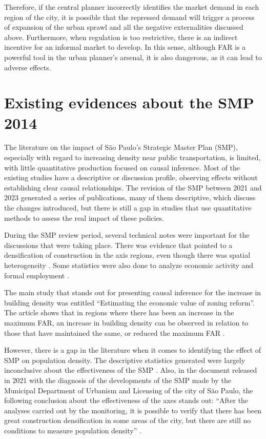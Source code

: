 Therefore, if the central planner incorrectly identifies the market demand in each region of the city, it is possible that the repressed demand will trigger a process of expansion of the urban sprawl and all the negative externalities discussed above. Furthermore, when regulation is too restrictive, there is an indirect incentive for an informal market to develop. In this sense, although FAR is a powerful tool in the urban planner's arsenal, it is also dangerous, as it can lead to adverse effects.

\section{Existing evidences about the SMP 2014}

The literature on the impact of São Paulo's Strategic Master Plan (SMP), especially with regard to increasing density near public transportation, is limited, with little quantitative production focused on causal inference. Most of the existing studies have a descriptive or discussion profile, observing effects without establishing clear causal relationships. The revision of the SMP between 2021 and 2023 generated a series of publications, many of them descriptive, which discuss the changes introduced, but there is still a gap in studies that use quantitative methods to assess the real impact of these policies.

During the SMP review period, several technical notes were important for the discussions that were taking place. There was evidence that pointed to a densification of construction in the axis regions, even though there was spatial heterogeneity \cite{IU50, nt1, nt2, Marques2023}. Some statistics were also done to analyze economic activity and formal employment \cite{IU52, IU54}.

The main study that stands out for presenting causal inference for the increase in building density was entitled ``Estimating the economic value of zoning reform''. The article shows that in regions where there has been an increase in the maximum FAR, an increase in building density can be observed in relation to those that have maintained the same, or reduced the maximum FAR \cite{Anagol2021}.

However, there is a gap in the literature when it comes to identifying the effect of SMP on population density. The descriptive statistics generated were largely inconclusive about the effectiveness of the SMP \cite{IU51, IU66}. Also, in the document released in 2021 with the diagnosis of the developments of the SMP made by the Municipal Department of Urbanism and Licensing of the city of São Paulo, the following conclusion about the effectiveness of the axes stands out: ``After the analyses carried out by the monitoring, it is possible to verify that there has been great construction densification in some areas of the city, but there are still no conditions to measure
population density'' \cite{PDE:diagnostico}.



